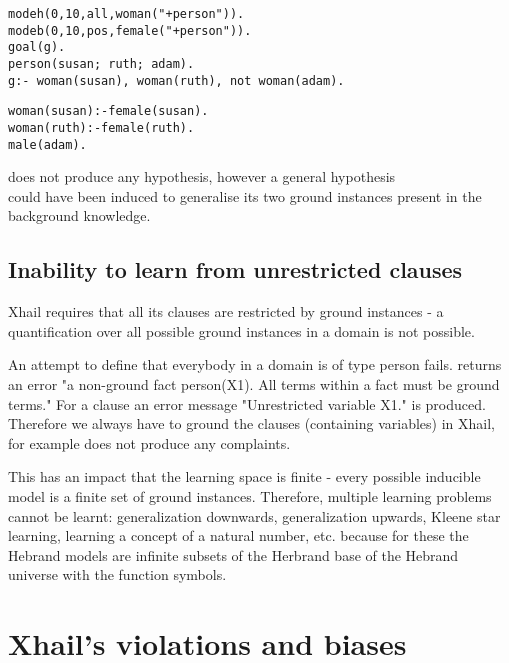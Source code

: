 \begin{minipage}[t]{.60\textwidth}
\begin{lstlisting}
modeh(0,10,all,woman("+person")).
modeb(0,10,pos,female("+person")).
goal(g).
person(susan; ruth; adam).
g:- woman(susan), woman(ruth), not woman(adam).
\end{lstlisting}
\end{minipage}
\begin{minipage}[t]{.20\textwidth}
\begin{lstlisting}
woman(susan):-female(susan).
woman(ruth):-female(ruth).
male(adam).
\end{lstlisting}
\end{minipage}

does not produce any hypothesis, however a general hypothesis\\
 could have been induced to generalise its two ground instances present in the background knowledge.

\subsection{Inability to learn from unrestricted clauses}
Xhail requires that all its clauses are restricted by ground instances - a quantification over all possible ground instances in a domain is not possible.

An attempt to define that everybody in a domain is of type person fails.  returns an error "a non-ground fact person(X1). All terms within a fact must be ground terms." For a clause  an error message "Unrestricted variable X1." is produced. Therefore we always have to ground the clauses (containing variables) in Xhail, for example
 does not produce any complaints.

This has an impact that the learning space is finite - every possible inducible model is a finite set of ground instances. Therefore, multiple learning problems cannot be learnt: generalization downwards, generalization upwards, Kleene star learning, learning a concept of a natural number, etc. because for these the Hebrand models are infinite subsets of the Herbrand base of the Hebrand universe with the function symbols.

\section{Xhail's violations and biases}

